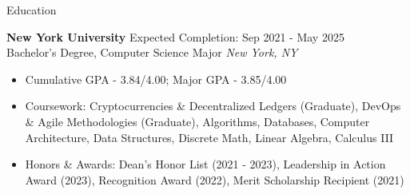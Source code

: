 \documentclass{resume} %
\begin{document}

\begin{rSection}{Education}

	\textbf{New York University} \hfill Expected Completion: Sep 2021 - May 2025\\
	Bachelor's Degree, Computer Science Major \hfill \textit{New York, NY}
	\begin{itemize}
		\item Cumulative GPA - 3.84/4.00; Major GPA - 3.85/4.00
		\item Coursework: Cryptocurrencies \& Decentralized Ledgers (Graduate), DevOps \& Agile Methodologies (Graduate),
		      Algorithms, Databases, Computer Architecture, Data Structures, Discrete Math,
		      Linear Algebra, Calculus III
		\item Honors \& Awards: Dean's Honor List (2021 - 2023), Leadership in Action Award (2023), Recognition Award (2022), Merit Scholarship Recipient (2021)
	\end{itemize}

\end{rSection}

\end{document}
